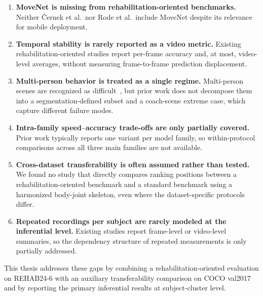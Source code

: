 \begin{enumerate}
  \item \textbf{MoveNet is missing from rehabilitation-oriented benchmarks.} Neither \v{C}ernek et al.\ nor Rode et al.\ include MoveNet despite its relevance for mobile deployment.
  \item \textbf{Temporal stability is rarely reported as a video metric.} Existing rehabilitation-oriented studies report per-frame accuracy and, at most, video-level averages, without measuring frame-to-frame prediction displacement.
  \item \textbf{Multi-person behavior is treated as a single regime.} Multi-person scenes are recognized as difficult~\cite{roggio2024comprehensive}, but prior work does not decompose them into a segmentation-defined subset and a coach-scene extreme case, which capture different failure modes.
  \item \textbf{Intra-family speed--accuracy trade-offs are only partially covered.} Prior work typically reports one variant per model family, so within-protocol comparisons across all three main families are not available.
  \item \textbf{Cross-dataset transferability is often assumed rather than tested.} We found no study that directly compares ranking positions between a rehabilitation-oriented benchmark and a standard benchmark using a harmonized body-joint skeleton, even where the dataset-specific protocols differ.
  \item \textbf{Repeated recordings per subject are rarely modeled at the inferential level.} Existing studies report frame-level or video-level summaries, so the dependency structure of repeated measurements is only partially addressed.
\end{enumerate}

This thesis addresses these gaps by combining a rehabilitation-oriented evaluation on REHAB24-6 with an auxiliary transferability comparison on COCO val2017 and by reporting the primary inferential results at subject-cluster level.
